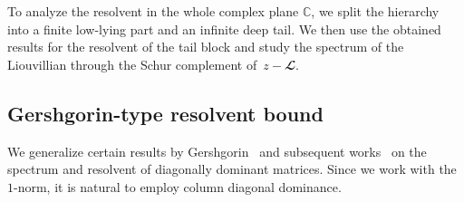 \documentclass{SciPost}
\begin{document}
To analyze the resolvent in the whole complex plane \(\mathbb C\), we split the hierarchy into a finite low-lying part and an infinite deep tail. We then use the obtained results for the resolvent of the tail block and study the spectrum of the Liouvillian through the Schur complement of~\(z - \mathbfcal L\).

\subsection{Gershgorin-type resolvent bound}

 
We generalize certain results by Gershgorin~\cite{Gershgorin1931} and subsequent works~\cite{Feingold1962, Varah1975, Salas1999, Varga2011} on the spectrum and resolvent of diagonally dominant matrices. Since we work with the \(1\)-norm, it is natural to employ column diagonal dominance.
\end{document}
